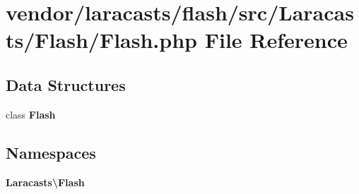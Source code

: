\section{vendor/laracasts/flash/src/\+Laracasts/\+Flash/\+Flash.php File Reference}
\label{_flash_8php}
\subsection*{Data Structures}
\begin{DoxyCompactItemize}
\item 
class {\bf Flash}
\end{DoxyCompactItemize}
\subsection*{Namespaces}
\begin{DoxyCompactItemize}
\item 
 {\bf Laracasts\textbackslash{}\+Flash}
\end{DoxyCompactItemize}
